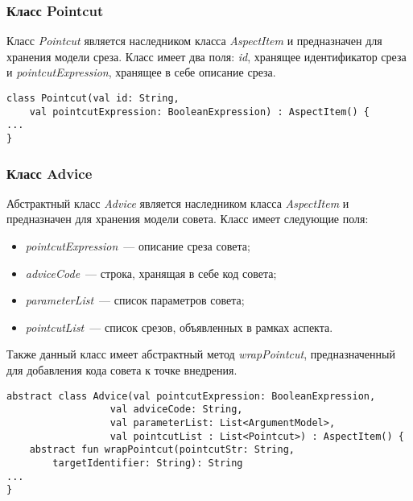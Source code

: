 \subsubsection{Класс Pointcut}
\label{ssub:Pointcut}
Класс \textit{Pointcut} является наследником класса \textit{AspectItem} и
предназначен для хранения модели среза.
Класс имеет два поля: \textit{id}, хранящее идентификатор среза и
\textit{pointcutExpression}, хранящее в себе описание среза.

\begin{lstlisting}[style={java}, label={lst:Pointcut},
  caption={Класс Pointcut}]
class Pointcut(val id: String,
	val pointcutExpression: BooleanExpression) : AspectItem() {
...
}
\end{lstlisting}
\subsubsection{Класс Advice}
\label{ssub:Advice}
Абстрактный класс \textit{Advice} является наследником класса
\textit{AspectItem} и предназначен для хранения модели совета.
Класс имеет следующие поля:
\begin{itemize}
	\item \textit{pointcutExpression}~--- описание среза совета;
	\item \textit{adviceCode}~--- строка, хранящая в себе код совета;
	\item \textit{parameterList}~--- список параметров совета;
	\item \textit{pointcutList}~--- список срезов, объявленных в рамках аспекта.
\end{itemize}

Также данный класс имеет абстрактный метод \textit{wrapPointcut},
предназначенный для добавления кода совета к точке внедрения.

\begin{lstlisting}[style={java}, label={lst:Advice},
  caption={Класс Advice}]
abstract class Advice(val pointcutExpression: BooleanExpression,
                  val adviceCode: String,
                  val parameterList: List<ArgumentModel>,
                  val pointcutList : List<Pointcut>) : AspectItem() {
	abstract fun wrapPointcut(pointcutStr: String,
		targetIdentifier: String): String
...
}
\end{lstlisting}
